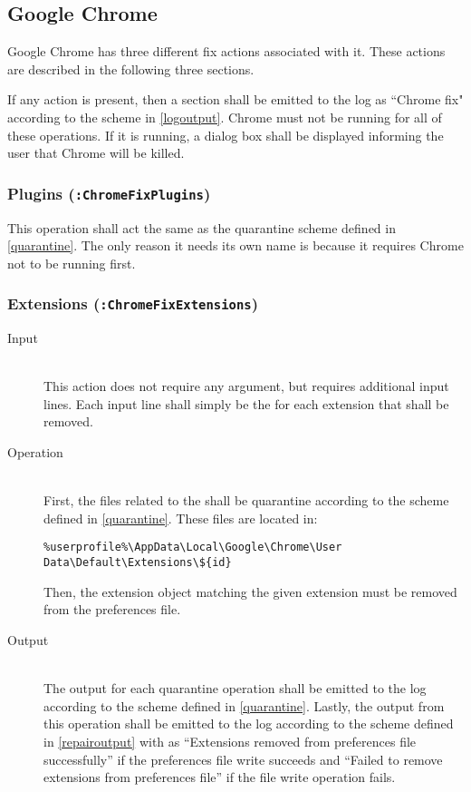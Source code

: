 \subsection{Google Chrome}
Google Chrome has three different fix actions associated with it.  These
actions are described in the following three sections.

If any action is present, then a section shall be emitted to the log as
``Chrome fix" according to the scheme in \ref{logoutput}.  Chrome must not
be running for all of these operations.  If it is running, a dialog box shall
be displayed informing the user that Chrome will be killed. 

\subsubsection{Plugins (\texttt{:ChromeFixPlugins})}
This operation shall act the same as the quarantine scheme
defined in \ref{quarantine}. The only reason it needs its own name is because it
requires Chrome not to be running first.

\subsubsection{Extensions (\texttt{:ChromeFixExtensions})}
\begin{description}
\item[Input] \hfill \\
This action does not require any argument, but requires additional input lines. 
Each input line shall simply be the  for each extension that shall be
removed.  
\item[Operation] \hfill \\
First, the files related to the  shall be quarantine according to the
scheme defined in \ref{quarantine}.  These files are located in:
\vspace{-\baselineskip}
\begin{verbatim}
%userprofile%\AppData\Local\Google\Chrome\User Data\Default\Extensions\${id}
\end{verbatim}
Then, the extension object matching the given extension  must be removed
from the preferences file.
\item[Output] \hfill \\
The output for each quarantine operation shall be emitted to the log according
to the scheme defined in \ref{quarantine}.  Lastly, the output from this
operation shall be emitted to the log according to the scheme defined in
\ref{repairoutput} with  as ``Extensions removed from preferences
file successfully'' if the preferences file write succeeds and ``Failed to
remove extensions from preferences file'' if the file write operation fails.
\end{description} 

